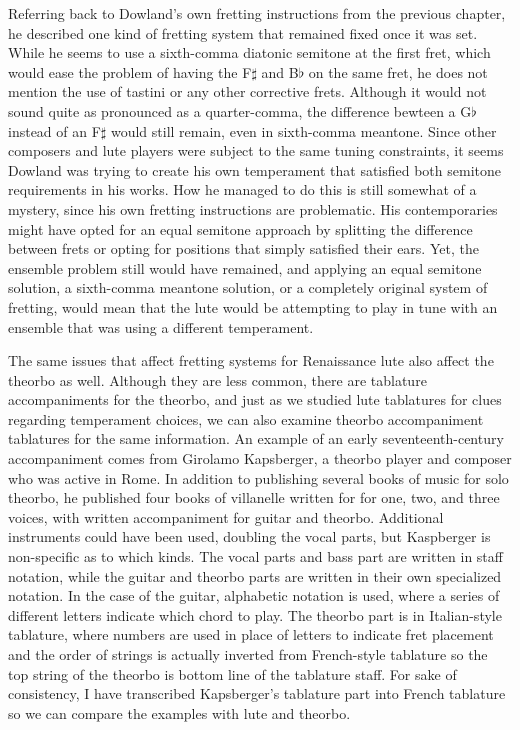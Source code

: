 Referring back to Dowland's own fretting instructions from the previous chapter,
he described one kind of fretting system that remained fixed once it was set.
While he seems to use a sixth-comma diatonic semitone at the first fret, which
would ease the problem of having the F$\sharp$ and B$\flat$ on the same fret, he
does not mention the use of tastini or any other corrective frets. Although it
would not sound quite as pronounced as a quarter-comma, the difference bewteen a
G$\flat$ instead of an F$\sharp$ would still remain, even in sixth-comma
meantone. Since other composers and lute players were subject to the same tuning
constraints, it seems Dowland was trying to create his own temperament that
satisfied both semitone requirements in his works. How he managed to do this is
still somewhat of a mystery, since his own fretting instructions are
problematic. His contemporaries might have opted for an equal semitone approach
by splitting the difference between frets or opting for positions that simply
satisfied their ears. Yet, the ensemble problem still would have remained, and
applying an equal semitone solution, a sixth-comma meantone solution, or a
completely original system of fretting, would mean that the lute would be
attempting to play in tune with an ensemble that was using a different
temperament.

The same issues that affect fretting systems for Renaissance lute also affect
the theorbo as well.  Although they are less common, there are tablature
accompaniments for the theorbo, and just as we studied lute tablatures for clues
regarding temperament choices, we can also examine theorbo accompaniment
tablatures for the same information. An example of an early seventeenth-century
accompaniment comes from Girolamo Kapsberger, a theorbo player and composer who
was active in Rome. In addition to publishing several books of music for solo
theorbo, he published four books of villanelle written for for one, two, and
three voices, with written accompaniment for guitar and theorbo.  Additional
instruments could have been used, doubling the vocal parts, but Kaspberger is
non-specific as to which kinds.  The vocal parts and bass part are written in
staff notation, while the guitar and theorbo parts are written in their own
specialized notation.  In the case of the guitar, alphabetic notation is used,
where a series of different letters indicate which chord to play. The theorbo
part is in Italian-style tablature, where numbers are used in place of letters
to indicate fret placement and the order of strings is actually inverted from
French-style tablature so the top string of the theorbo is bottom line of the
tablature staff.  For sake of consistency, I have transcribed Kapsberger's
tablature part into French tablature so we can compare the examples with lute
and theorbo.

